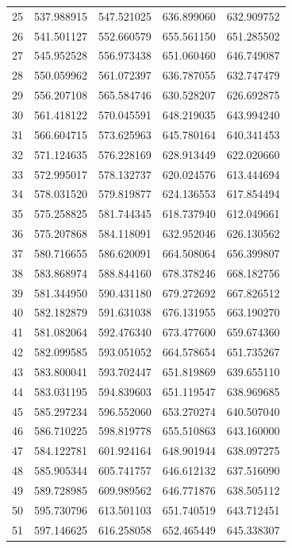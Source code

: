 \begin{table}
\begin{tabular}{rrrrr}
25 & 537.988915 & 547.521025 & 636.899060 & 632.909752 \\
26 & 541.501127 & 552.660579 & 655.561150 & 651.285502 \\
27 & 545.952528 & 556.973438 & 651.060460 & 646.749087 \\
28 & 550.059962 & 561.072397 & 636.787055 & 632.747479 \\
29 & 556.207108 & 565.584746 & 630.528207 & 626.692875 \\
30 & 561.418122 & 570.045591 & 648.219035 & 643.994240 \\
31 & 566.604715 & 573.625963 & 645.780164 & 640.341453 \\
32 & 571.124635 & 576.228169 & 628.913449 & 622.020660 \\
33 & 572.995017 & 578.132737 & 620.024576 & 613.444694 \\
34 & 578.031520 & 579.819877 & 624.136553 & 617.854494 \\
35 & 575.258825 & 581.744345 & 618.737940 & 612.049661 \\
36 & 575.207868 & 584.118091 & 632.952046 & 626.130562 \\
37 & 580.716655 & 586.620091 & 664.508064 & 656.399807 \\
38 & 583.868974 & 588.844160 & 678.378246 & 668.182756 \\
39 & 581.344950 & 590.431180 & 679.272692 & 667.826512 \\
40 & 582.182879 & 591.631038 & 676.131955 & 663.190270 \\
41 & 581.082064 & 592.476340 & 673.477600 & 659.674360 \\
42 & 582.099585 & 593.051052 & 664.578654 & 651.735267 \\
43 & 583.800041 & 593.702447 & 651.819869 & 639.655110 \\
44 & 583.031195 & 594.839603 & 651.119547 & 638.969685 \\
45 & 585.297234 & 596.552060 & 653.270274 & 640.507040 \\
46 & 586.710225 & 598.819778 & 655.510863 & 643.160000 \\
47 & 584.122781 & 601.924164 & 648.901944 & 638.097275 \\
48 & 585.905344 & 605.741757 & 646.612132 & 637.516090 \\
49 & 589.728985 & 609.989562 & 646.771876 & 638.505112 \\
50 & 595.730796 & 613.501103 & 651.740519 & 643.712451 \\
51 & 597.146625 & 616.258058 & 652.465449 & 645.338307 \\

\end{tabular}
\end{table}
